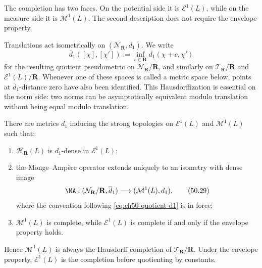 The completion has two faces.  On the potential side it is
$\mathcal E^1(L)$, while on the measure side it is
$\mathcal M^1(L)$.  The second description does not require the envelope
property.

Translations act isometrically on $(\mathcal N_{\mathbf R},d_1)$.  We
write
\begin{equation}
\label{eq:ch50-quotient-d1}
 \overline d_1([\chi],[\chi'])
 :=\inf_{c\in\mathbf R}d_1(\chi+c,\chi')
\tag{50.28a}
\end{equation}
for the resulting quotient pseudometric on
$\mathcal N_{\mathbf R}/\mathbf R$, and similarly on
$\mathcal T_{\mathbf R}/\mathbf R$ and
$\mathcal E^1(L)/\mathbf R$.  Whenever one of these spaces is called a
metric space below, points at $\overline d_1$-distance zero have also been
identified.  This Hausdorffization is essential on the norm side: two
norms can be asymptotically equivalent modulo translation without being
equal modulo translation.

\begin{theorem}\label{thm:stability-norm-completion}
There are metrics $d_1$ inducing the strong topologies on
$\mathcal E^1(L)$ and $\mathcal M^1(L)$ such that:
\begin{enumerate}
\item $\mathcal H_{\mathbf R}(L)$ is $d_1$-dense in
      $\mathcal E^1(L)$;
\item the Monge--Amp\`ere operator extends uniquely to an isometry with
      dense image
      \[
       \MA:(\mathcal N_{\mathbf R}/\mathbf R,\overline d_1)
               \longrightarrow(\mathcal M^1(L),d_1),
      \tag{50.29}\label{eq:stability-norm-ma-isometry}
      \]
      where the convention following \eqref{eq:ch50-quotient-d1} is in
      force;
\item $\mathcal M^1(L)$ is complete, while $\mathcal E^1(L)$ is
      complete if and only if the envelope property holds.
\end{enumerate}
Hence $\mathcal M^1(L)$ is always the Hausdorff completion of
$\mathcal T_{\mathbf R}/\mathbf R$.  Under the envelope property,
$\mathcal E^1(L)$ is the completion before quotienting by constants.
\end{theorem}

